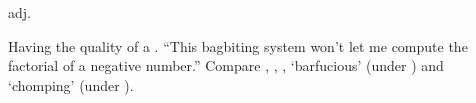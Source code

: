  adj.

Having the quality of a . ``This bagbiting system won't let
me compute the factorial of a negative number.'' Compare ,
, , `barfucious' (under
) and `chomping' (under ).

